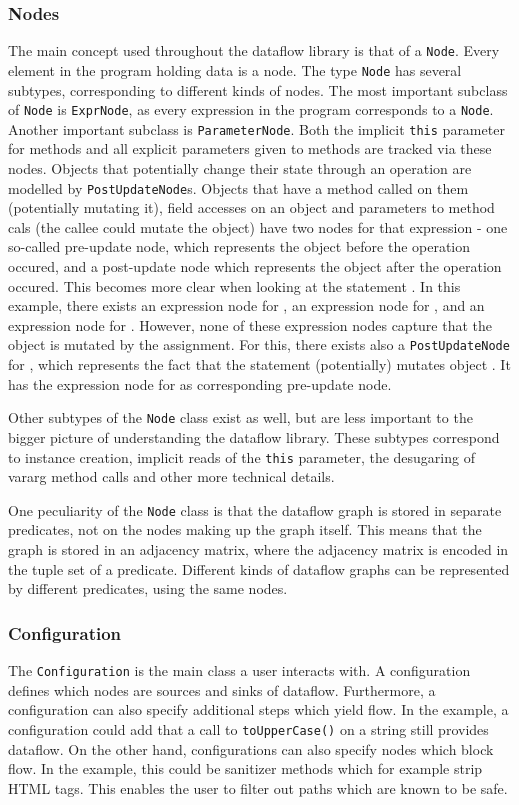 \subsubsection*{Nodes}
The main concept used throughout the dataflow library is that of a \texttt{Node}.
Every element in the program holding data is a node.
The type \texttt{Node} has several subtypes, corresponding to different kinds of nodes.
The most important subclass of \texttt{Node} is \texttt{ExprNode}, 
as every expression in the program corresponds to a \texttt{Node}.
Another important subclass is \texttt{ParameterNode}.
Both the implicit \texttt{this} parameter for methods and all explicit parameters
given to methods are tracked via these nodes.
Objects that potentially change their state through an operation are modelled
 by \texttt{PostUpdateNode}s.
Objects that have a method called on them (potentially mutating it),
field accesses on an object and parameters to method cals (the callee could mutate the object)
have two nodes for that expression - one so-called pre-update node, which represents 
the object before the operation occured, and a post-update node which represents 
the object after the operation occured.
This becomes more clear when looking at the statement .
In this example, there exists an expression node for 
, an expression node for ,
and an expression node for .
However, none of these expression nodes capture that the object 
is mutated by the assignment.
For this, there exists also a \texttt{PostUpdateNode} for ,
which represents the fact that the statement (potentially) mutates object .
It has the expression node for  as corresponding pre-update node.

Other subtypes of the \texttt{Node} class exist as well, 
but are less important to the bigger picture of understanding the dataflow library.
These subtypes correspond to instance creation, implicit reads of the \texttt{this} parameter,
the desugaring of vararg method calls and other more technical details.

One peculiarity of the \texttt{Node} class is that the dataflow graph
is stored in separate predicates, not on the nodes making up the graph itself.
This means that the graph is stored in an adjacency matrix, where the
 adjacency matrix is encoded in the tuple set of a predicate.
Different kinds of dataflow graphs can be represented by different predicates,
using the same nodes.

\subsubsection*{Configuration}
The \texttt{Configuration} is the main class a user interacts with.
A configuration defines which nodes are sources and sinks of dataflow.
Furthermore, a configuration can also specify additional steps which yield flow.
In the example, a configuration could add that a call to 
\texttt{toUpperCase()} on a string still provides dataflow.
On the other hand, configurations can also specify nodes which block flow.
In the example, this could be sanitizer methods which for example strip HTML tags.
This enables the user to filter out paths which are known to be safe.

